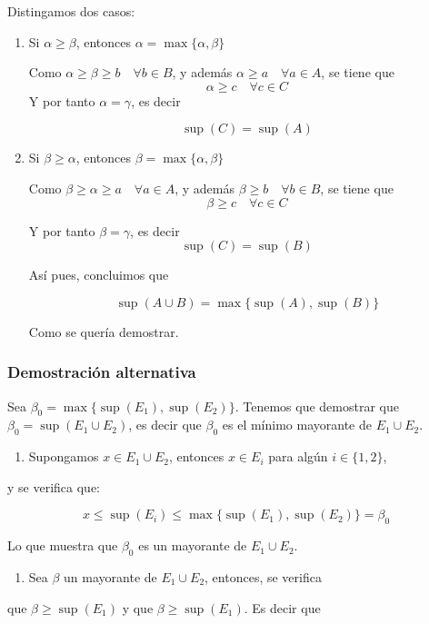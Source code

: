 \documentclass[11pt]{article}
\begin{document}
Distingamos dos casos:

\begin{enumerate}
\item Si $\alpha \geq \beta$, entonces $\alpha = \max\{\alpha,\beta\}$
\label{sec-2-2-1-1}

Como $\alpha \geq \beta \geq b \quad \forall b \in B$, y además $\alpha \geq a \quad \forall a \in A$,
se tiene que
\[
\alpha \geq c \quad \forall c \in C
\]
Y por tanto $\alpha = \gamma$, es decir 

\[
\sup(C) = \sup(A)
\]

\item Si $\beta \geq \alpha$, entonces $\beta = \max\{\alpha,\beta\}$
\label{sec-2-2-1-2}

Como $\beta \geq \alpha \geq a \quad \forall a \in A$, y además  $\beta \geq b \quad \forall b \in B$,
se tiene que
\[
\beta \geq c \quad \forall c \in C
\]

Y por tanto $\beta = \gamma$, es decir
\[
\sup(C) = \sup(B)
\]

Así pues, concluimos que

\[
\sup(A\cup B) = \max\{\sup(A), \sup(B)\}
\]

Como se quería demostrar.
\end{enumerate}

\subsubsection{Demostración alternativa}
\label{sec-2-2-2}

Sea $\beta_0 = \max\{\sup(E_1), \sup(E_2)\}$. Tenemos que demostrar
que $\beta_0 = \sup(E_1 \cup E_2)$, es decir que $\beta_0$ es el mínimo
mayorante de $E_1 \cup E_2$.

\begin{enumerate}
\item Supongamos $x \in E_1 \cup E_2$, entonces $x \in E_i$ para algún $i \in \{1,2\}$,
\end{enumerate}
y se verifica que:

\[ x \leq \sup(E_i) \leq \max\{\sup(E_1), \sup(E_2)\} = \beta_0 \]

Lo que muestra que $\beta_0$ es un mayorante de $E_1 \cup E_2$.

\begin{enumerate}
\item Sea $\beta$ un mayorante de $E_1 \cup E_2$, entonces, se verifica
\end{enumerate}
que $\beta \geq \sup(E_1)$ y que $\beta \geq \sup(E_1)$. Es decir que
\end{document}
